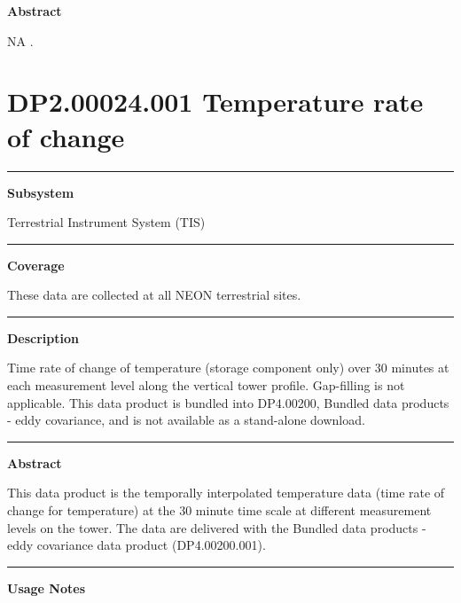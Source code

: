\documentclass[]{article}
\begin{document}
\textbf{Abstract}

NA \newpage
.

\section{DP2.00024.001 Temperature rate of
change}\label{dp2.00024.001-temperature-rate-of-change}

\begin{center}\rule{0.5\linewidth}{\linethickness}\end{center}

\textbf{Subsystem}

Terrestrial Instrument System (TIS)

\begin{center}\rule{0.5\linewidth}{\linethickness}\end{center}

\textbf{Coverage}

These data are collected at all NEON terrestrial sites.

\begin{center}\rule{0.5\linewidth}{\linethickness}\end{center}

\textbf{Description}

Time rate of change of temperature (storage component only) over 30
minutes at each measurement level along the vertical tower profile.
Gap-filling is not applicable. This data product is bundled into
DP4.00200, Bundled data products - eddy covariance, and is not available
as a stand-alone download.

\begin{center}\rule{0.5\linewidth}{\linethickness}\end{center}

\textbf{Abstract}

This data product is the temporally interpolated temperature data (time
rate of change for temperature) at the 30 minute time scale at different
measurement levels on the tower. The data are delivered with the Bundled
data products - eddy covariance data product (DP4.00200.001).

\begin{center}\rule{0.5\linewidth}{\linethickness}\end{center}

\textbf{Usage Notes}
\end{document}
